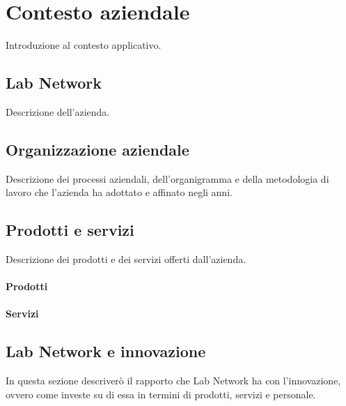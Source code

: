 
\chapter{Contesto aziendale}
\label{cap:introduzione}

Introduzione al contesto applicativo.\\

\section{Lab Network}
Descrizione dell'azienda.

\section{Organizzazione aziendale}
Descrizione dei processi aziendali, dell'organigramma e della metodologia di lavoro che l'azienda ha adottato e affinato negli anni.

\section{Prodotti e servizi}
Descrizione dei prodotti e dei servizi offerti dall'azienda.
\subsubsection{Prodotti}

\subsubsection{Servizi}

\section{Lab Network e innovazione}
In questa sezione descriverò il rapporto che Lab Network ha con l'innovazione, ovvero come investe su di essa in termini di prodotti, servizi e personale.
